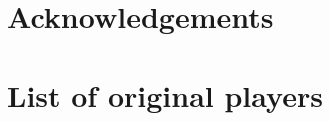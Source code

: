 \documentclass{article}
\begin{document}
\section*{Acknowledgements}





\appendix

\section{List of original players}\label{app:list_of_original_players}


\begin{multicols}{2}
    \begin{enumerate}
            
    \end{enumerate}
\end{multicols}
\end{document}
